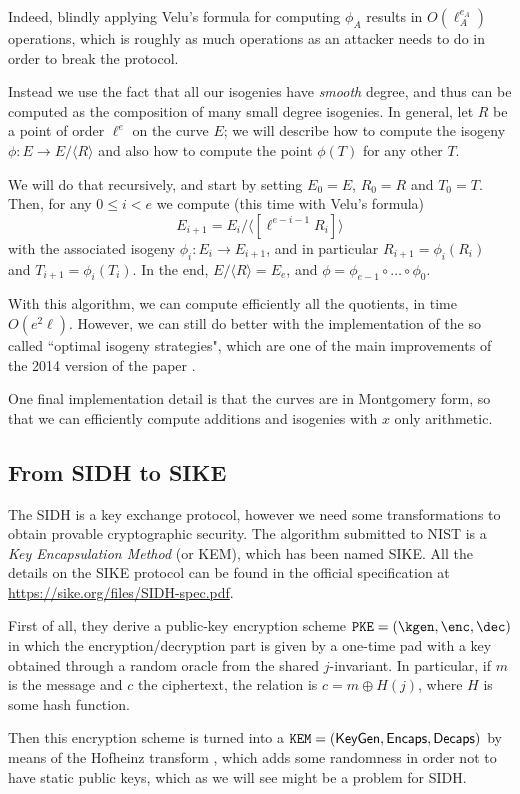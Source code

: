 Indeed, blindly applying Velu's formula for computing $\phi_A$ results in $O(\ell_A^{e_A})$ operations, which is roughly as much operations as an attacker needs to do in order to break the protocol.

Instead we use the fact that all our isogenies have \emph{smooth} degree, and thus can be computed as the composition of many small degree isogenies. In general, let $R$ be a point of order $\ell^e$ on the curve $E$; we will describe how to compute the isogeny $\phi:E\to E/\langle R\rangle$ and also how to compute the point $\phi(T)$ for any other $T$.

We will do that recursively, and start by setting $E_0=E$, $R_0=R$ and $T_0=T$. Then, for any $0\le i<e$ we compute (this time with Velu's formula) $$E_{i+1}=E_i/\langle [\ell^{e-i-1}R_i] \rangle$$ with the associated isogeny $\phi_i:E_i\to E_{i+1}$, and in particular $R_{i+1}=\phi_i(R_i)$ and $T_{i+1}=\phi_i(T_i)$. In the end, $E/\langle R \rangle=E_e$, and $\phi=\phi_{e-1}\circ\dots\circ\phi_0$.

With this algorithm, we can compute efficiently all the quotients, in time $O(e^2\ell)$. However, we can still do better with the implementation of the so called ``optimal isogeny strategies", which are one of the main improvements of the 2014 version of the paper \cite{SIDH14}.

One final implementation detail is that the curves are in Montgomery form, so that we can efficiently compute additions and isogenies with $x$ only arithmetic.

\subsection{From SIDH to SIKE}
The SIDH is a key exchange protocol, however we need some transformations to obtain provable cryptographic security. The algorithm submitted to NIST is a \emph{Key Encapsulation Method} (or KEM), which has been named SIKE. All the details on the SIKE protocol can be found in the official specification at \url{https://sike.org/files/SIDH-spec.pdf}.

First of all, they derive a public-key encryption scheme $\texttt{PKE}=(\kgen,\enc,\dec)$ in which the encryption/decryption part is given by a one-time pad with a key obtained through a random oracle from the shared $j$-invariant. In particular, if $m$ is the message and $c$ the ciphertext, the relation is $c=m\oplus H(j)$, where $H$ is some hash function.

Then this encryption scheme is turned into a $\texttt{KEM}=(\mathsf{KeyGen}, \mathsf{Encaps}, \mathsf{Decaps})$ by means of the Hofheinz transform \cite{Hofheinz}, which adds some randomness in order not to have static public keys, which as we will see might be a problem for SIDH.

